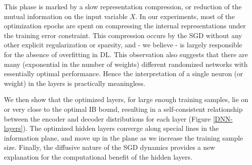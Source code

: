 \documentclass[11pt]{article}
\begin{document}
This phase is marked by a slow representation compression, or reduction of the mutual information on the input variable $X$.   
In our experiments, most of the optimization epochs are spent on compressing the internal representations under the training error constraint. This compression occurs by the SGD without any other explicit regularization or sparsity, and - we believe - is largely responsible for the absence of overfitting in DL. This observation also suggests that there are many (exponential in the number of weights) different randomized networks with essentially optimal performance. Hence the interpretation of a single neuron (or weight) in the layers is practically meaningless. 

We then show that the optimized layers, for large enough training samples, lie on or very close to the optimal IB bound, resulting in a self-consistent relationship between the encoder and decoder distributions for each layer (Figure \ref{DNN-layers}). The optimized hidden layers converge along special lines in the information plane, and move up in the plane as we increase the training sample size.  
Finally, the diffusive nature of the SGD dynamics provides a new explanation for the computational benefit of the hidden layers. 
\end{document}
